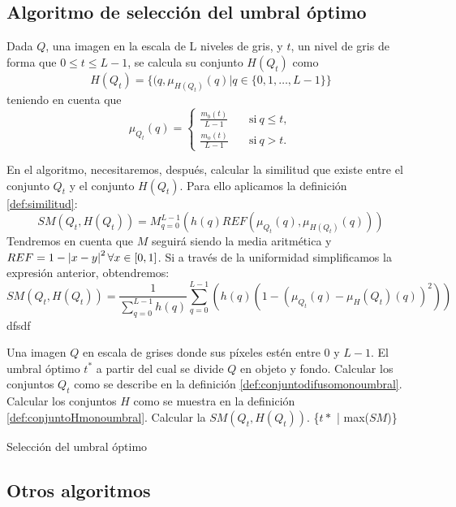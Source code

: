 \subsection{Algoritmo de selección del umbral óptimo}\label{sec:algoritmo3}

\begin{definition}\label{def:conjuntoHmonoumbral}
Dada $Q$, una imagen en la escala de L niveles de gris, y $t$, un nivel de gris de forma que $0\leq t\leq L-1$, se calcula su conjunto $H(Q_t)$ como
$$H(Q_t) = \{(q, \mu_{H(Q_t)}(q)|q\in \{0,1,\dots, L-1\}\}$$ 
teniendo en cuenta que
$$\mu_{Q_t}(q) = \left\{ \begin{aligned}
    \frac{m_b(t)}{L-1} & \quad\text{si}\ q\leq t,\\
    \frac{m_o(t)}{L-1} & \quad\text{si}\ q> t.
 \end{aligned}\right.$$
 \end{definition}

En el algoritmo, necesitaremos, después, calcular la similitud que existe entre el conjunto $Q_t$ y el conjunto $H(Q_t)$. Para ello aplicamos la definición \ref{def:similitud}:
$$SM(Q_t, H(Q_t)) = M^{L-1}_{q=0}(h(q)REF(\mu_{Q_t}(q), \mu_{H(Q_t)}(q)))$$
Tendremos en cuenta que $M$ seguirá siendo la media aritmética y $REF=1-\left\vert x-y\right\vert^2 \forall x\in[0,1]$. Si a través de la uniformidad simplificamos la expresión anterior, obtendremos:
$$SM(Q_t, H(Q_t)) = \frac{1}{\sum_{q=0}^{L-1}h(q)} \sum_{q=0}^{L-1}\left(h(q)(1-(\mu_{Q_t}(q)-\mu_H{(Q_t)}(q))^2)\right)$$
dfsdf

\begin{algorithm}[!ht]
\begin{algorithmic}[1]
\REQUIRE Una imagen $Q$ en escala de grises donde sus píxeles estén entre $0$ y $L-1$.
\ENSURE El umbral óptimo $t^*$ a partir del cual se divide $Q$ en objeto y fondo.
\STATE Calcular los conjuntos $Q_t$ como se describe en la definición \ref{def:conjuntodifusomonoumbral}.
\STATE Calcular los conjuntos $H$ como se muestra en la definición \ref{def:conjuntoHmonoumbral}.
\STATE Calcular la $SM(Q_t, H(Q_t))$.
\ENDFOR
\RETURN \{$t*$ | max($SM$)\}
\end{algorithmic}
\caption{Selección del umbral óptimo}\label{alg:algoritmo3}
\end{algorithm}



\subsection{Otros algoritmos}\label{sec:otrosalgoritmos}
